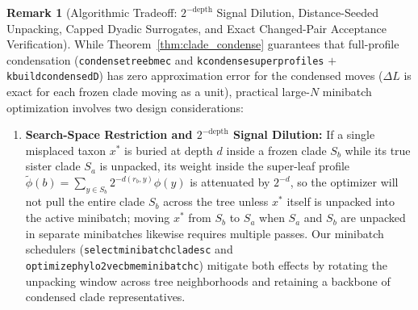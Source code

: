 \documentclass[11pt,a4paper]{article}
\makeatletter
\DeclareRobustCommand{\_}{\ifmmode\nfss@text{\textunderscore}\else\textunderscore\allowbreak\fi}
\theoremstyle{definition}
\newtheorem{remark}[theorem]{Remark}
\makeatother
\begin{document}
\begin{remark}[Algorithmic Tradeoff: $2^{-\text{depth}}$ Signal Dilution, Distance-Seeded Unpacking, Capped Dyadic Surrogates, and Exact Changed-Pair Acceptance Verification]
\label{rem:minibatch_tradeoffs}
While Theorem~\ref{thm:clade_condense} guarantees that full-profile condensation (\texttt{condense\_tree\_bme\_c} and \texttt{k\_condense\_super\_profiles} $+$ \texttt{k\_build\_condensed\_D}) has zero approximation error for the condensed moves ($\Delta L$ is exact for each frozen clade moving as a unit), practical large-$N$ minibatch optimization involves two design considerations:
\begin{enumerate}
    \item \textbf{Search-Space Restriction and $2^{-\text{depth}}$ Signal Dilution:} If a single misplaced taxon $x^*$ is buried at depth $d$ inside a frozen clade $S_b$ while its true sister clade $S_a$ is unpacked, its weight inside the super-leaf profile $\widetilde{\phi}(b) = \sum_{y \in S_b} 2^{-d(r_b, y)} \phi(y)$ is attenuated by $2^{-d}$, so the optimizer will not pull the entire clade $S_b$ across the tree unless $x^*$ itself is unpacked into the active minibatch; moving $x^*$ from $S_b$ to $S_a$ when $S_a$ and $S_b$ are unpacked in separate minibatches likewise requires multiple passes. Our minibatch schedulers (\texttt{select\_minibatch\_clades\_c} and \texttt{optimize\_phylo2vec\_bme\_minibatch\_c}) mitigate both effects by rotating the unpacking window across tree neighborhoods and retaining a backbone of condensed clade representatives.

\end{enumerate}
\end{remark}
\end{document}
